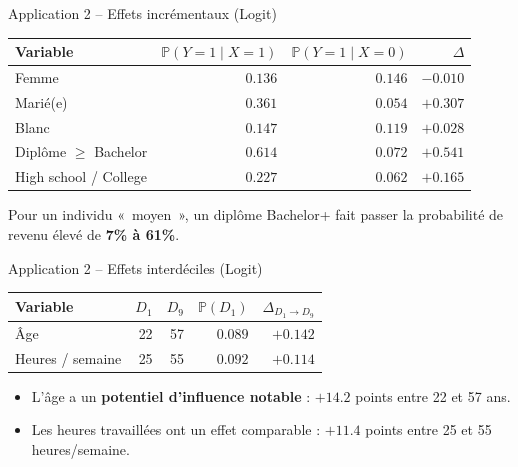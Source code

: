 \documentclass[11pt,aspectratio=169]{beamer}
\newcommand{\PP}{\mathbb{P}}
\begin{document}
\begin{frame}{Application 2 -- Effets incrémentaux (Logit)}

\begin{center}
    \small
    \renewcommand{\arraystretch}{1.3}
    \begin{tabular}{lrrr}
        \toprule
        \textbf{Variable} & $\PP(Y=1 \mid X=1)$ & $\PP(Y=1 \mid X=0)$ & $\Delta$ \\
        \midrule
        Femme & $0.136$ & $0.146$ & $-0.010$ \\
        Marié(e) & $0.361$ & $0.054$ & $+0.307$ \\
        Blanc & $0.147$ & $0.119$ & $+0.028$ \\
        Diplôme $\geq$ Bachelor & $0.614$ & $0.072$ & $+0.541$ \\
        High school / College & $0.227$ & $0.062$ & $+0.165$ \\
        \bottomrule
    \end{tabular}
\end{center}

Pour un individu «~moyen~», un diplôme Bachelor+ fait passer la
probabilité de revenu élevé de \textbf{7\% à 61\%}.

\end{frame}

\begin{frame}{Application 2 -- Effets interdéciles (Logit)}

\begin{center}
    \small
    \renewcommand{\arraystretch}{1.3}
    \begin{tabular}{lrrrr}
        \toprule
        \textbf{Variable} & $D_1$ & $D_9$ & $\PP(D_1)$ & $\Delta_{D_1 \to D_9}$ \\
        \midrule
        Âge & 22 & 57 & $0.089$ & $+0.142$ \\
        Heures / semaine & 25 & 55 & $0.092$ & $+0.114$ \\
        \bottomrule
    \end{tabular}
\end{center}

\begin{itemize}

\item L'âge a un \textbf{potentiel d'influence notable} : $+14.2$ points
  entre 22 et 57 ans.\newline

\item Les heures travaillées ont un effet comparable : $+11.4$ points
  entre 25 et 55 heures/semaine.

\end{itemize}

\end{frame}
\end{document}
